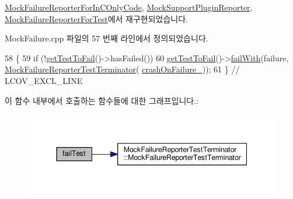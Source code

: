 \hyperlink{class_mock_failure_reporter_for_in_c_only_code_a6f443322dd35770ebfa247dbbe02392c}{Mock\+Failure\+Reporter\+For\+In\+C\+Only\+Code}, \hyperlink{class_mock_support_plugin_reporter_a362b87ef076bcdf039e8510021fcf5ee}{Mock\+Support\+Plugin\+Reporter}, \hyperlink{class_mock_failure_reporter_for_test_a275e824525aa26cb8874437442cdc186}{Mock\+Failure\+Reporter\+For\+Test}에서 재구현되었습니다.



Mock\+Failure.\+cpp 파일의 57 번째 라인에서 정의되었습니다.


\begin{DoxyCode}
58 \{
59     \textcolor{keywordflow}{if} (!\hyperlink{class_mock_failure_reporter_ae3f75fac53b4d3395e02ee8eca858422}{getTestToFail}()->hasFailed())
60         \hyperlink{class_mock_failure_reporter_ae3f75fac53b4d3395e02ee8eca858422}{getTestToFail}()->\hyperlink{class_utest_shell_ad50ae28f5ad9f1d224832cb1f89365a7}{failWith}(failure, 
      \hyperlink{class_mock_failure_reporter_test_terminator}{MockFailureReporterTestTerminator}(
      \hyperlink{class_mock_failure_reporter_a9faf961cbe6687577f4eaae4625bcbea}{crashOnFailure\_}));
61 \} \textcolor{comment}{// LCOV\_EXCL\_LINE}
\end{DoxyCode}


이 함수 내부에서 호출하는 함수들에 대한 그래프입니다.\+:
\nopagebreak
\begin{figure}[H]
\begin{center}
\leavevmode
\includegraphics[width=344pt]{class_mock_failure_reporter_a275e824525aa26cb8874437442cdc186_cgraph}
\end{center}
\end{figure}




